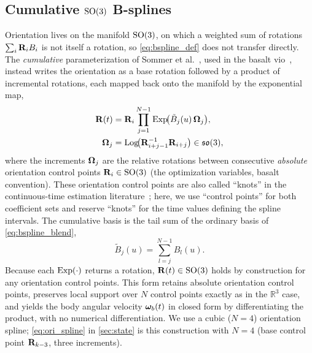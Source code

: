 \subsection{Cumulative $\mathrm{SO}(3)$ B-splines}
\label{sec:prelim_so3}
Orientation lives on the manifold $\mathrm{SO}(3)$, on which a weighted sum of
rotations $\sum_i \mathbf{R}_i B_i$ is not itself a rotation, so
\eqref{eq:bspline_def} does not transfer directly.  The
\emph{cumulative} parameterization of Sommer et
al.~\cite{sommer2020efficient}, used in the basalt
\ac{vio}~\cite{usenko2020basalt}, instead writes the orientation as a
base rotation followed by a product of incremental rotations, each
mapped back onto the manifold by the exponential map,
\begin{equation}
  \begin{aligned}
  \mathbf{R}(t) &= \mathbf{R}_{i}
           \prod_{j=1}^{N-1}
           \mathrm{Exp}\!\bigl(\tilde{B}_j(u)\,\boldsymbol{\Omega}_j\bigr), \\
  \boldsymbol{\Omega}_j &= \mathrm{Log}\!\bigl(\mathbf{R}_{i+j-1}^{-1}\mathbf{R}_{i+j}\bigr)\in\mathfrak{so}(3),
  \end{aligned}
  \label{eq:prelim_so3}
\end{equation}
where the increments $\boldsymbol{\Omega}_j$ are the relative rotations between
consecutive \emph{absolute} orientation control points $\mathbf{R}_i\in\mathrm{SO}(3)$
(the optimization variables, basalt convention).  These orientation
control points are also called ``knots'' in the continuous-time
estimation literature~\cite{sommer2020efficient}; here, we use
``control points'' for both coefficient sets and reserve ``knots''
for the time values defining the spline intervals.  The cumulative
basis is the tail sum of the ordinary basis of \eqref{eq:bspline_blend},
\begin{equation}
  \tilde{B}_j(u) = \sum_{l=j}^{N-1} B_l(u).
  \label{eq:cumbasis}
\end{equation}
Because each $\mathrm{Exp}(\cdot)$ returns a rotation, $\mathbf{R}(t)\in\mathrm{SO}(3)$ holds by
construction for any orientation control points.  This form retains
absolute orientation control points, preserves local support over $N$
control points exactly as in the $\mathbb{R}^3$ case, and yields the body
angular velocity $\boldsymbol{\omega}_b(t)$ in
closed form by differentiating the product, with no numerical
differentiation.  We use a cubic ($N{=}4$) orientation spline;
\eqref{eq:ori_spline} in \autoref{sec:state} is this construction with
$N{=}4$ (base control point $\mathbf{R}_{k-3}$, three increments).

